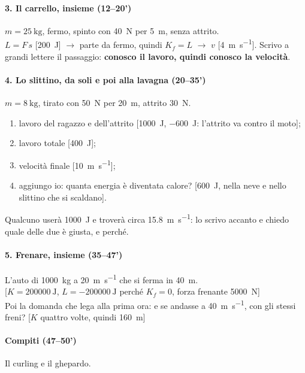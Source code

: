 \documentclass[11pt]{report}
\begin{document}
\paragraph{3. Il carrello, insieme (12--20')}
$m=\SI{25}{\kilogram}$, fermo, spinto con \SI{40}{\newton} per \SI{5}{\metre}, senza attrito.\\
$L=F\,s$ [\SI{200}{\joule}] $\to$ parte da fermo, quindi $K_f=L$ $\to$ $v$ [\SI{4}{\metre\per\second}]. Scrivo a grandi lettere il passaggio: \textbf{conosco il lavoro, quindi conosco la velocità}.

\paragraph{4. Lo slittino, da soli e poi alla lavagna (20--35')}
$m=\SI{8}{\kilogram}$, tirato con \SI{50}{\newton} per \SI{20}{\metre}, attrito \SI{30}{\newton}.
\begin{enumerate}
  \item lavoro del ragazzo e dell'attrito [\SI{1000}{\joule}, \SI{-600}{\joule}: l'attrito va contro il moto];
  \item lavoro totale [\SI{400}{\joule}];
  \item velocità finale [\SI{10}{\metre\per\second}];
  \item aggiungo io: quanta energia è diventata calore? [\SI{600}{\joule}, nella neve e nello slittino che si scaldano].
\end{enumerate}
Qualcuno userà \SI{1000}{\joule} e troverà circa \SI{15.8}{\metre\per\second}: lo scrivo accanto e chiedo quale delle due è giusta, e perché.

\paragraph{5. Frenare, insieme (35--47')}
L'auto di \SI{1000}{\kilogram} a \SI{20}{\metre\per\second} che si ferma in \SI{40}{\metre}.\\
{}[$K=\SI{200000}{\joule}$, $L=\SI{-200000}{\joule}$ perché $K_f=0$, forza frenante \SI{5000}{\newton}]\\
Poi la domanda che lega alla prima ora: e se andasse a \SI{40}{\metre\per\second}, con gli stessi freni? [$K$ quattro volte, quindi \SI{160}{\metre}]

\paragraph{Compiti (47--50')}
Il curling e il ghepardo.
\end{document}

